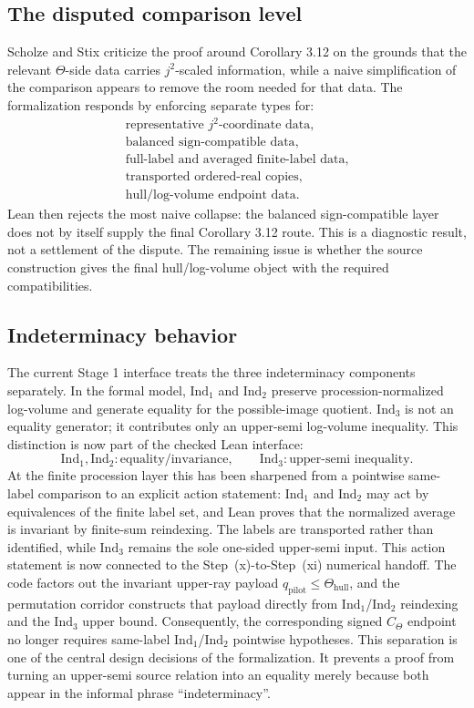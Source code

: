 \documentclass[11pt]{article}
\newcommand{\IndOne}{\ensuremath{\mathrm{Ind}_1}}
\newcommand{\IndTwo}{\ensuremath{\mathrm{Ind}_2}}
\newcommand{\IndThree}{\ensuremath{\mathrm{Ind}_3}}
\theoremstyle{plain}
\theoremstyle{definition}
\theoremstyle{remark}
\begin{document}
\subsection{The disputed comparison level}

Scholze and Stix criticize the proof around Corollary 3.12 on the grounds that
the relevant \(\Theta\)-side data carries \(j^2\)-scaled information, while a
naive simplification of the comparison appears to remove the room needed for
that data.  The formalization responds by enforcing separate types for:
\[
\begin{array}{c}
\text{representative } j^2\text{-coordinate data},\\
\text{balanced sign-compatible data},\\
\text{full-label and averaged finite-label data},\\
\text{transported ordered-real copies},\\
\text{hull/log-volume endpoint data}.
\end{array}
\]
Lean then rejects the most naive collapse: the balanced sign-compatible layer
does not by itself supply the final Corollary 3.12 route.  This is a diagnostic
result, not a settlement of the dispute.  The remaining issue is whether the
source construction gives the final hull/log-volume object with the required
compatibilities.

\subsection{Indeterminacy behavior}

The current Stage 1 interface treats the three indeterminacy components
separately.  In the formal model, \IndOne{} and \IndTwo{} preserve
procession-normalized log-volume and generate equality for the possible-image
quotient.  \IndThree{} is not an equality generator; it contributes only an
upper-semi log-volume inequality.  This distinction is now part of the checked
Lean interface:
\[
\IndOne,\IndTwo : \text{equality/invariance},\qquad
\IndThree : \text{upper-semi inequality}.
\]
At the finite procession layer this has been sharpened from a pointwise
same-label comparison to an explicit action statement: \IndOne{} and
\IndTwo{} may act by equivalences of the finite label set, and Lean proves
that the normalized average is invariant by finite-sum reindexing.  The labels
are transported rather than identified, while \IndThree{} remains the sole
one-sided upper-semi input.
This action statement is now connected to the Step~(x)-to-Step~(xi) numerical
handoff.  The code factors out the invariant upper-ray payload
\(q_{\mathrm{pilot}}\leq \Theta_{\mathrm{hull}}\), and the permutation corridor
constructs that payload directly from \IndOne{}/\IndTwo{} reindexing and the
\IndThree{} upper bound.  Consequently, the corresponding signed
\(C_\Theta\) endpoint no longer requires same-label \IndOne{}/\IndTwo{}
pointwise hypotheses.
This separation is one of the central design decisions of the formalization.
It prevents a proof from turning an upper-semi source relation into an equality
merely because both appear in the informal phrase ``indeterminacy''.
\end{document}
